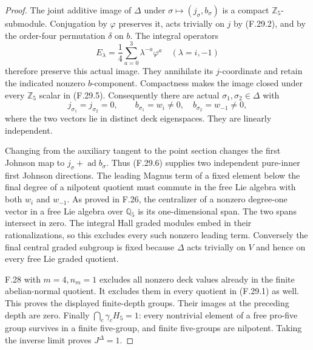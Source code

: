\begin{proof}
The joint additive image of
$\Delta$ under $\sigma\mapsto
(j_\sigma,b_\sigma)$ is a compact
$\mathbb Z_5$-submodule.
Conjugation by $\varphi$ preserves
it, acts trivially on $j$ by
(F.29.2), and by the order-four
permutation $\delta$ on $b$.
The integral operators
\[
        E_\lambda=\frac14
             \sum_{a=0}^3\lambda^{-a}\varphi^a
                      \quad(\lambda=i,-1)
                                                               \tag{F.29.5}
\]
therefore preserve this actual image.
They annihilate its $j$-coordinate
and retain the indicated nonzero
$b$-component.  Compactness makes
the image closed under every
$\mathbb Z_5$ scalar in (F.29.5).
Consequently there are actual
$\sigma_1,\sigma_2\in\Delta$
with
\[
 j_{\sigma_1}=j_{\sigma_2}=0,\qquad
 b_{\sigma_1}=w_i\ne0,\quad
 b_{\sigma_2}=w_{-1}\ne0,                                  \tag{F.29.6}
\]
where the two vectors lie in
distinct deck eigenspaces.
They are linearly independent.

Changing from the auxiliary tangent
to the point section changes the
first Johnson map to
$j_\sigma+\operatorname{ad}b_\sigma$.
Thus (F.29.6) supplies two independent
pure-inner first Johnson directions.
The leading Magnus term of a fixed
element below the final degree of
a nilpotent quotient must commute
in the free Lie algebra with both
$w_i$ and $w_{-1}$.
As proved in F.26, the centralizer
of a nonzero degree-one vector in
a free Lie algebra over $\mathbb Q_5$
is its one-dimensional span.
The two spans intersect in zero.
The integral Hall graded modules
embed in their rationalizations,
so this excludes every such
nonzero leading term.
Conversely the final central
graded subgroup is fixed because
$\Delta$ acts trivially on $V$
and hence on every free Lie
graded quotient.

F.28 with $m=4,n_m=1$ excludes
all nonzero deck values already
in the finite abelian-normal
quotient.  It excludes them
in every quotient in (F.29.1)
as well.  This proves the
displayed finite-depth groups.
Their images at the preceding
depth are zero.  Finally
$\bigcap_c\gamma_cH_5=1$:
every nontrivial element of a
free pro-five group survives
in a finite five-group, and
finite five-groups are nilpotent.
Taking the inverse limit proves
$J^\Delta=1$.
\end{proof}


